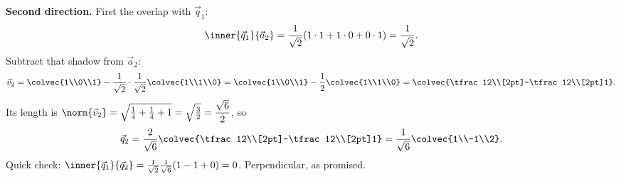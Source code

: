 \textbf{Second direction.} First the overlap with $\vec{q}_1$:
\[
  \inner{\vec{q}_1}{\vec{a}_2}
   = \frac{1}{\sqrt2}(1\cdot 1 + 1\cdot 0 + 0\cdot 1) = \frac{1}{\sqrt2}.
\]
Subtract that shadow from $\vec{a}_2$:
\[
  \vec{v}_2
   = \colvec{1\\0\\1} - \frac{1}{\sqrt2}\cdot\frac{1}{\sqrt2}\colvec{1\\1\\0}
   = \colvec{1\\0\\1} - \frac12\colvec{1\\1\\0}
   = \colvec{\tfrac12\\[2pt]-\tfrac12\\[2pt]1}.
\]
Its length is $\norm{\vec{v}_2}=\sqrt{\tfrac14+\tfrac14+1}=\sqrt{\tfrac32}=\dfrac{\sqrt6}{2}$, so
\[
  \vec{q}_2 = \frac{2}{\sqrt6}\colvec{\tfrac12\\[2pt]-\tfrac12\\[2pt]1}
            = \frac{1}{\sqrt6}\colvec{1\\-1\\2}.
\]
Quick check: $\inner{\vec{q}_1}{\vec{q}_2}=\frac{1}{\sqrt2}\frac{1}{\sqrt6}(1-1+0)=0$.
Perpendicular, as promised.

